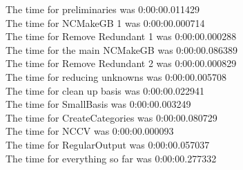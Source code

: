 \documentclass[rep10,leqno]{report}
\begin{document}
\noindent
The time for preliminaries was 0:00:00.011429\\
The time for NCMakeGB 1 was 0:00:00.000714\\
The time for Remove Redundant 1 was 0:00:00.000288\\
The time for the main NCMakeGB was 0:00:00.086389\\
The time for Remove Redundant 2 was 0:00:00.000829\\
The time for reducing unknowns was 0:00:00.005708\\
The time for clean up basis was 0:00:00.022941\\
The time for SmallBasis was 0:00:00.003249\\
The time for CreateCategories was 0:00:00.080729\\
The time for NCCV was 0:00:00.000093\\
The time for RegularOutput was 0:00:00.057037\\
The time for everything so far was 0:00:00.277332\\
\end{document}
